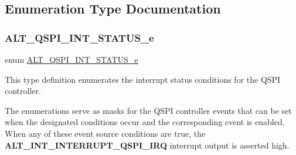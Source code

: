 \subsection{Enumeration Type Documentation}
\mbox{\label{group__ALT__QSPI__CSR_ga919562dd181acc42914bea253e31fae1}} 
\subsubsection{\texorpdfstring{ALT\_QSPI\_INT\_STATUS\_e}{ALT\_QSPI\_INT\_STATUS\_e}}
{\footnotesize\ttfamily enum \mbox{\hyperlink{group__ALT__QSPI__CSR_ga919562dd181acc42914bea253e31fae1}{A\+L\+T\+\_\+\+Q\+S\+P\+I\+\_\+\+I\+N\+T\+\_\+\+S\+T\+A\+T\+U\+S\+\_\+e}}}

This type definition enumerates the interrupt status conditions for the Q\+S\+PI controller.

The enumerations serve as masks for the Q\+S\+PI controller events that can be set when the designated conditions occur and the corresponding event is enabled. When any of these event source conditions are true, the {\bfseries{A\+L\+T\+\_\+\+I\+N\+T\+\_\+\+I\+N\+T\+E\+R\+R\+U\+P\+T\+\_\+\+Q\+S\+P\+I\+\_\+\+I\+RQ}} interrupt output is asserted high.

